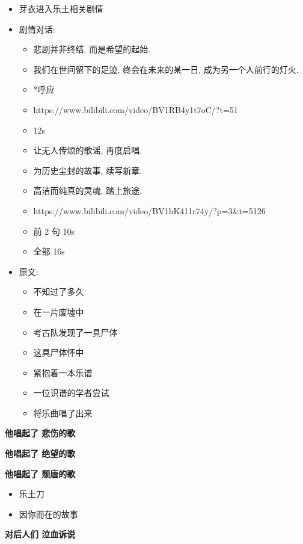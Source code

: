 \documentclass[a4paper]{article}
\begin{document}
\begin{itemize}
    \item 芽衣进入乐土相关剧情
    \item 剧情对话:
    \begin{itemize}
        \item 悲剧并非终结, 而是希望的起始.
        \item 我们在世间留下的足迹, 终会在未来的某一日, 成为另一个人前行的灯火.
        \item *呼应
        \item https://www.bilibili.com/video/BV1RB4y1t7oC/?t=51
        \item 12s
    \end{itemize}
    \begin{itemize}
        \item 让无人传颂的歌谣, 再度启唱.
        \item 为历史尘封的故事, 续写新章.
        \item 高洁而纯真的灵魂, 踏上旅途.
        \item https://www.bilibili.com/video/BV1hK411r74y/?p=3&t=5126
        \item 前 2 句 10s
        \item 全部 16s
    \end{itemize}
    \item 原文:
    \begin{itemize}
        \item 不知过了多久
        \item 在一片废墟中
        \item 考古队发现了一具尸体
        \item 这具尸体怀中
        \item 紧抱着一本乐谱
        \item 一位识谱的学者尝试
        \item 将乐曲唱了出来
    \end{itemize}
\end{itemize}

\textbf{他唱起了 悲伤的歌}

\textbf{他唱起了 绝望的歌}

\textbf{他唱起了 颓唐的歌}

\begin{itemize}
    \item 乐土刀
    \item 因你而在的故事
\end{itemize}

\textbf{对后人们 泣血诉说}
\end{document}
